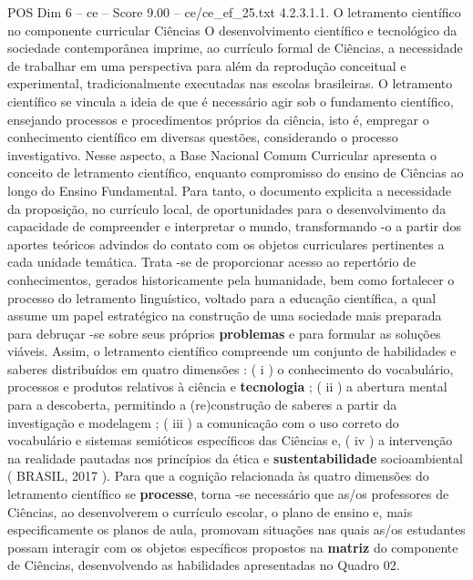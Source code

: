 \begin{textsample}{POS Dim 6 – ce – Score 9.00 – ce/ce\_ef\_25.txt}  \label{ex:f6_pos_037}
4.2.3.1.1.
O letramento científico no componente curricular Ciências O desenvolvimento científico e tecnológico da sociedade contemporânea imprime, ao currículo formal de Ciências, a necessidade de trabalhar em uma perspectiva para além da reprodução conceitual e experimental, tradicionalmente executadas nas escolas brasileiras.
O letramento científico se vincula a ideia de que é necessário agir sob o fundamento científico, ensejando processos e procedimentos próprios da ciência, isto é, empregar o conhecimento científico em diversas questões, considerando o processo investigativo.
Nesse aspecto, a Base Nacional Comum Curricular apresenta o conceito de letramento científico, enquanto compromisso do ensino de Ciências ao longo do Ensino Fundamental.
Para tanto, o documento explicita a necessidade da proposição, no currículo local, de oportunidades para o desenvolvimento da capacidade de compreender e interpretar o mundo, transformando -o a partir dos aportes teóricos advindos do contato com os objetos curriculares pertinentes a cada unidade temática.
Trata -se de proporcionar acesso ao repertório de conhecimentos, gerados historicamente pela humanidade, bem como fortalecer o processo do letramento linguístico, voltado para a educação científica, a qual assume um papel estratégico na construção de uma sociedade mais preparada para debruçar -se sobre seus próprios \textbf{problemas} e para formular as soluções viáveis.
Assim, o letramento científico compreende um conjunto de habilidades e saberes distribuídos em quatro dimensões : ( i ) o conhecimento do vocabulário, processos e produtos relativos à ciência e \textbf{tecnologia} ; ( ii ) a abertura mental para a descoberta, permitindo a (re)construção de saberes a partir da investigação e modelagem ; ( iii ) a comunicação com o uso correto do vocabulário e sistemas semióticos específicos das Ciências e, ( iv ) a intervenção na realidade pautadas nos princípios da ética e \textbf{sustentabilidade} socioambiental ( BRASIL, 2017 ).
Para que a cognição relacionada às quatro dimensões do letramento científico se \textbf{processe}, torna -se necessário que as/os professores de Ciências, ao desenvolverem o currículo escolar, o plano de ensino e, mais especificamente os planos de aula, promovam situações nas quais as/os estudantes possam interagir com os objetos específicos propostos na \textbf{matriz} do componente de Ciências, desenvolvendo as habilidades apresentadas no Quadro 02.

\end{textsample}
